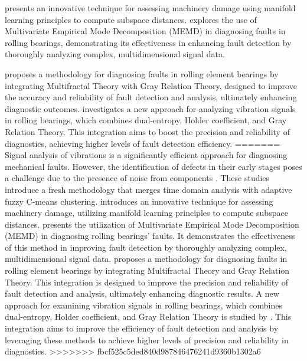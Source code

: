 \documentclass[sn-basic,pdflatex]{sn-jnl}
\theoremstyle{remark}
\theoremstyle{definition}
\begin{document}
\citet{WOS:000366765500038} presents an innovative technique for
assessing machinery damage using manifold learning principles to compute
subspace distances. \citet{WOS:000379556300014} explores the use of
Multivariate Empirical Mode Decomposition (MEMD) in diagnosing faults in
rolling bearings, demonstrating its effectiveness in enhancing fault
detection by thoroughly analyzing complex, multidimensional signal data.

\citet{WOS:000391229300006} proposes a methodology for diagnosing faults
in rolling element bearings by integrating Multifractal Theory with Gray
Relation Theory, designed to improve the accuracy and reliability of
fault detection and analysis, ultimately enhancing diagnostic outcomes.
\citet{WOS:000426819400027} investigates a new approach for analyzing
vibration signals in rolling bearings, which combines dual-entropy,
Holder coefficient, and Gray Relation Theory. This integration aims to
boost the precision and reliability of diagnostics, achieving higher
levels of fault detection efficiency.
=======
Signal analysis of vibrations is a significantly efficient approach for
diagnosing mechanical faults. However, the identification of defects in
their early stages poses a challenge due to the presence of noise from
components \citep{WOS:000369301600001, WOS:000367992900001}. These
studies introduce a fresh methodology that merges time domain analysis
with adaptive fuzzy C-means clustering. \citet{WOS:000366765500038}
introduces an innovative technique for assessing machinery damage,
utilizing manifold learning principles to compute subspace distances.
\citet{WOS:000379556300014} presents the utilization of Multivariate
Empirical Mode Decomposition (MEMD) in diagnosing rolling bearings'
faults. It demonstrates the effectiveness of this method in improving
fault detection by thoroughly analyzing complex, multidimensional signal
data. \citet{WOS:000391229300006} proposes a methodology for diagnosing
faults in rolling element bearings by integrating Multifractal Theory
and Gray Relation Theory. This integration is designed to improve the
precision and reliability of fault detection and analysis, ultimately
enhancing diagnostic results. A new approach for examining vibration
signals in rolling bearings, which combines dual-entropy, Holder
coefficient, and Gray Relation Theory is studied by
\citet{WOS:000426819400027}. This integration aims to improve the
efficiency of fault detection and analysis by leveraging these methods
to achieve higher levels of precision and reliability in diagnostics.
>>>>>>> fbcf525c5ded840d987846476241d9360b1302a6
\end{document}

